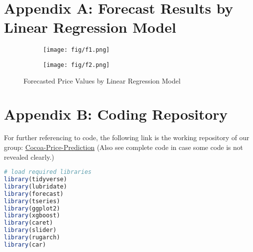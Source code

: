 \documentclass[10pt]{article}
\begin{document}
\newpage



\newpage

\appendix
\section*{Appendix A: Forecast Results by Linear Regression Model}
\begin{figure}[h!]
    \captionsetup{font=scriptsize}
    \centering
    \begin{subfigure}[b]{0.45\textwidth}
        \centering
        \texttt{[image: fig/f1.png]}
        \label{fig:m5_c1}
    \end{subfigure}
    \begin{subfigure}[b]{0.45\textwidth}
        \centering
        \texttt{[image: fig/f2.png]}
        \label{fig:m5_c2}
    \end{subfigure}
    \caption{Forecasted Price Values by Linear Regression Model}
    \label{fig:diff_lof}
\end{figure}

\newpage

\section*{Appendix B: Coding Repository}
For further referencing to code, the following link is the working repository of our group: \href{https://github.com/Henry-wxq/Cocoa_Price_Prediction}{Cocoa-Price-Prediction} (Also see complete code in case some code is not revealed clearly.)


\begin{lstlisting}[language=R, caption=Package]
# load required libraries
library(tidyverse)
library(lubridate)
library(forecast)
library(tseries)
library(ggplot2)
library(xgboost)
library(caret)
library(slider)
library(rugarch)
library(car)
\end{lstlisting}
\end{document}
